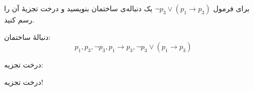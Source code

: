 برای فرمول
$\neg p_3\vee (p_1\to p_3)$
یک دنباله‌ی ساختمان بنویسید و درخت تجزیهٔ آن را رسم کنید.
\begin{ans}
    دنبالهٔ ساختمان:
    $$
    p_1,p_3,\neg p_3,p_1\to p_3,\neg p_3\vee (p_1\to p_3)
    $$

    درخت تجزیه:

    \begin{center}
        درخت تجزیه!
    \end{center}
\end{ans}
